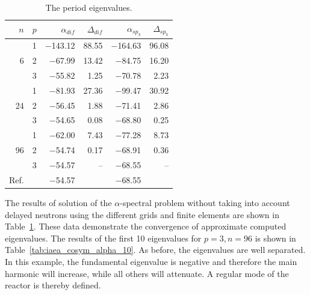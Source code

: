 \documentclass[authoryear]{elsarticle}
\begin{document}
\begin{table}[h]
\caption{The period eigenvalues.}
\label{tab:iaea_cosym_alpha}
\begin{center}
\begin{tabular}{rrrrrr}
\hline
$n$ & $p$ & $\alpha_{dif}$ & $\Delta_{dif}$ &$\alpha_{sp_3}$& $\Delta_{sp_3}$ \\
\hline
	& 1	&$-$143.12 &  88.55 & $-$164.63& 96.08\\
6	& 2	& $-$67.99 &  13.42 & $-$84.75 & 16.20\\
	& 3	& $-$55.82 &   1.25 & $-$70.78 &  2.23\\ 
\hline
	& 1	& $-$81.93 &  27.36 & $-$99.47 & 30.92\\
24& 2	& $-$56.45 &   1.88 & $-$71.41 & 2.86\\
	& 3	& $-$54.65 &   0.08 & $-$68.80 & 0.25\\ 
\hline
	& 1	& $-$62.00 &   7.43 & $-$77.28 & 8.73\\
96& 2	& $-$54.74 &   0.17 & $-$68.91 & 0.36\\
	& 3	& $-$54.57 &	   -- & $-$68.55 & -- \\ 
\hline
Ref.& & $-$54.57 & & $-$68.55 \\ 
\hline
\end{tabular}
\end{center}
\end{table}
The results of solution of the $\alpha$-spectral problem without taking into account delayed neutrons using the different grids and finite elements are shown in Table~\ref{tab:iaea_cosym_alpha}.
These data demonstrate the convergence of approximate computed eigenvalues.
The results of the first 10 eigenvalues for $ p = 3, n = 96 $ is shown in Table~\ref{tab:iaea_cosym_alpha_10}.
As before, the eigenvalues are well separated.
In this example, the fundamental eigenvalue is negative and therefore the main harmonic will increase, while all others will attenuate. 
A regular mode of the reactor is thereby defined.
\end{document}
